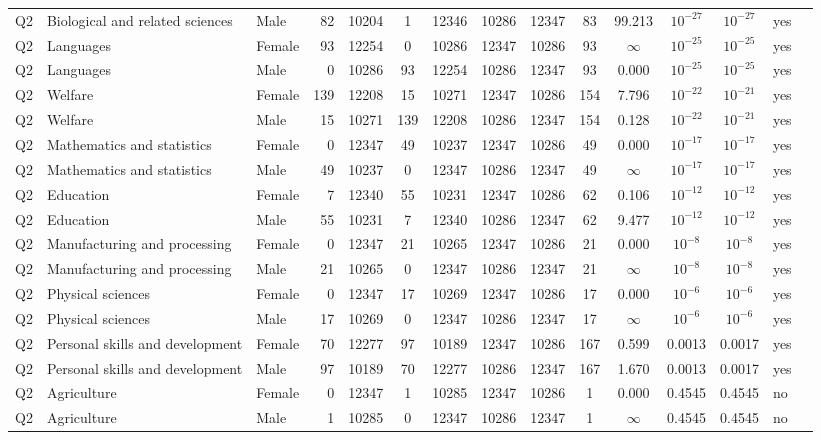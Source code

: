 \begin{longtable}{lllrcccccccccll}
Q2 & Biological and related sciences & Male & 82 & 10204 & 1 & 12346 & 10286 & 12347 & 83 & 99.213 & $10^{-27}$ & $10^{-27}$ & yes \\
Q2 & Languages & Female & 93 & 12254 & 0 & 10286 & 12347 & 10286 & 93 & $\infty$ & $10^{-25}$ & $10^{-25}$ & yes \\
Q2 & Languages & Male & 0 & 10286 & 93 & 12254 & 10286 & 12347 & 93 & 0.000 & $10^{-25}$ & $10^{-25}$ & yes \\
Q2 & Welfare & Female & 139 & 12208 & 15 & 10271 & 12347 & 10286 & 154 & 7.796 & $10^{-22}$ & $10^{-21}$ & yes \\
Q2 & Welfare & Male & 15 & 10271 & 139 & 12208 & 10286 & 12347 & 154 & 0.128 & $10^{-22}$ & $10^{-21}$ & yes \\
Q2 & Mathematics and statistics & Female & 0 & 12347 & 49 & 10237 & 12347 & 10286 & 49 & 0.000 & $10^{-17}$ & $10^{-17}$ & yes \\
Q2 & Mathematics and statistics & Male & 49 & 10237 & 0 & 12347 & 10286 & 12347 & 49 & $\infty$ & $10^{-17}$ & $10^{-17}$ & yes \\
Q2 & Education & Female & 7 & 12340 & 55 & 10231 & 12347 & 10286 & 62 & 0.106 & $10^{-12}$ & $10^{-12}$ & yes \\
Q2 & Education & Male & 55 & 10231 & 7 & 12340 & 10286 & 12347 & 62 & 9.477 & $10^{-12}$ & $10^{-12}$ & yes \\
Q2 & Manufacturing and processing & Female & 0 & 12347 & 21 & 10265 & 12347 & 10286 & 21 & 0.000 & $10^{-8}$ & $10^{-8}$ & yes \\
Q2 & Manufacturing and processing & Male & 21 & 10265 & 0 & 12347 & 10286 & 12347 & 21 & $\infty$ & $10^{-8}$ & $10^{-8}$ & yes \\
Q2 & Physical sciences & Female & 0 & 12347 & 17 & 10269 & 12347 & 10286 & 17 & 0.000 & $10^{-6}$ & $10^{-6}$ & yes \\
Q2 & Physical sciences & Male & 17 & 10269 & 0 & 12347 & 10286 & 12347 & 17 & $\infty$ & $10^{-6}$ & $10^{-6}$ & yes \\
Q2 & Personal skills and development & Female & 70 & 12277 & 97 & 10189 & 12347 & 10286 & 167 & 0.599 & 0.0013 & 0.0017 & yes \\
Q2 & Personal skills and development & Male & 97 & 10189 & 70 & 12277 & 10286 & 12347 & 167 & 1.670 & 0.0013 & 0.0017 & yes \\
Q2 & Agriculture & Female & 0 & 12347 & 1 & 10285 & 12347 & 10286 & 1 & 0.000 & 0.4545 & 0.4545 & no \\
Q2 & Agriculture & Male & 1 & 10285 & 0 & 12347 & 10286 & 12347 & 1 & $\infty$ & 0.4545 & 0.4545 & no \\

\end{longtable}
